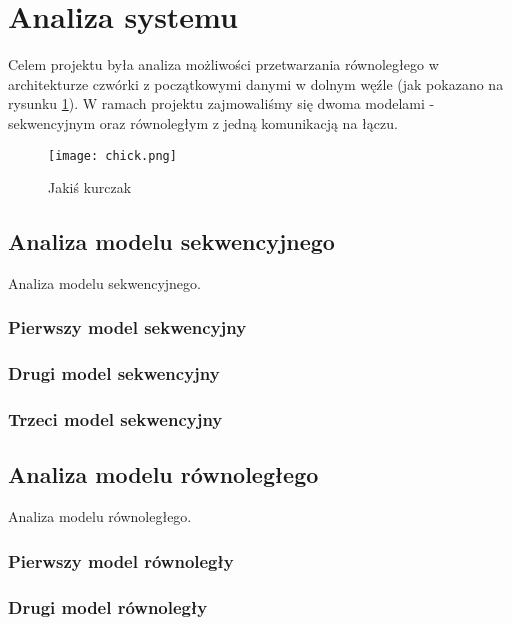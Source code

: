 
\section{Analiza systemu}

Celem projektu była analiza możliwości przetwarzania równoległego w architekturze czwórki z początkowymi danymi w dolnym węźle (jak pokazano na rysunku \ref{fig:kurczak}).
W ramach projektu zajmowaliśmy się dwoma modelami - sekwencyjnym oraz równoległym z jedną komunikacją na łączu.

\begin{figure}[!ht]
\centering
\texttt{[image: chick.png]}
\caption{Jakiś kurczak}
\label{fig:kurczak}
\end{figure}

\subsection{Analiza modelu sekwencyjnego}

Analiza modelu sekwencyjnego.

\subsubsection{Pierwszy model sekwencyjny}

\subsubsection{Drugi model sekwencyjny}

\subsubsection{Trzeci model sekwencyjny}

\subsection{Analiza modelu równoległego}

Analiza modelu równoległego.

\subsubsection{Pierwszy model równoległy}

\subsubsection{Drugi model równoległy}

